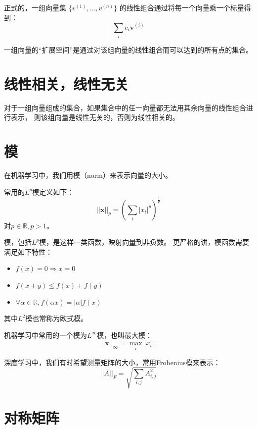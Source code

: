 正式的，一组向量集 $\{v^{(1)},... , v^{(n)}\}$ 的线性组合通过将每一个向量乘一个标量得到：
\begin{equation}
  \sum_i c_i \bm{v}^{(i)}
\end{equation}

一组向量的“扩展空间”是通过对该组向量的线性组合而可以达到的所有点的集合。




\section{线性相关，线性无关}

对于一组向量组成的集合，如果集合中的任一向量都无法用其余向量的线性组合进行表示，
则该组向量是线性无关的，否则为线性相关的。


\section{模}

在机器学习中，我们用模（norm）来表示向量的大小。

常用的$L^p$模定义如下：
\begin{equation}
  \label{eq:lp}
  ||\bm{x}||_p = \left ( \sum_i |x_i|^p \right )^{\frac{1}{p}}
\end{equation}
对$p\in \mathbb{R}, p>1$。


模，包括$L^p$模，是这样一类函数，映射向量到非负数。
更严格的讲，模函数需要满足如下特性：
\begin{itemize}
\item $f(x) = 0 \Rightarrow x=0$
\item $f(x+y) \le f(x) + f(y)$
\item $\forall \alpha \in \mathbb{R}, f(\alpha x)=|\alpha|f(x)$
\end{itemize}

其中$L^2$模也常称为欧式模。


机器学习中常用的一个模为$L^\infty$模，也叫最大模：
\begin{equation}
  \label{eq:max-norm}
  ||\bm{x}||_\infty = \max_i |x_i|.
\end{equation}


深度学习中，我们有时希望测量矩阵的大小，常用Frobenius模来表示：
\begin{equation}
||A ||_F=\sqrt{\sum_{i,j}A_{i,j}^2}
\end{equation}


\section{对称矩阵}


